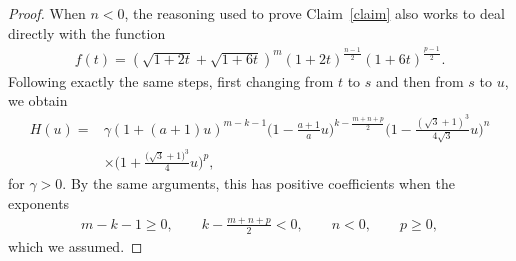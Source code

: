 \begin{proof}
When $n<0$, the reasoning used to prove Claim~\ref{claim} also works to deal directly with the function
\begin{gather*}
f(t)=\left(\sqrt{1+2t}+\sqrt{1+6t}\right)^m {(1+2t)}^{\frac{n-1}{2}} (1+6t)^{\frac{p-1}{2}}.
\end{gather*}
Following exactly the same steps, first changing from $t$ to $s$ and then from $s$ to $u$, we obtain
\begin{align*}
H(u)={}&\gamma (1+(a+1)u)^{m-k-1} \biggl(1-\frac{a+1}{a}u\biggr)^{k-\frac{m+n+p}{2}} \biggl(1-\frac{(\sqrt{3}+1)^3}{4\sqrt{3}}u\biggr)^{n}
\\
&\times \biggl(1+\frac{\big(\sqrt{3}+1\big)^3}{4}u\biggr)^p,
\end{align*}
for $\gamma>0$. By the same arguments, this has positive coefficients when the exponents
\begin{gather*}
m-k-1\geq 0, \qquad k-\frac{m+n+p}{2}<0, \qquad n<0, \qquad p\geq 0,
\end{gather*}
which we assumed.
\end{proof}


